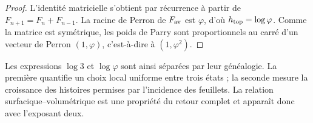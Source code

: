 \begin{proof}
L’identité matricielle s’obtient par récurrence à partir de
\(F_{n+1}=F_n+F_{n-1}\). La racine de Perron de \(F_{\rm av}\) est \(\varphi\),
d’où \(h_{\rm top}=\log\varphi\). Comme la matrice est symétrique, les poids
de Parry \cite{Parry1964} sont proportionnels au carré d’un vecteur de Perron
\((1,\varphi)\), c’est-à-dire à \((1,\varphi^2)\).
\end{proof}

Les expressions \(\log3\) et \(\log\varphi\) sont ainsi séparées par leur
généalogie. La première quantifie un choix local uniforme entre trois
états ; la seconde mesure la croissance des histoires permises par
l’incidence des feuillets. La relation surfacique--volumétrique est une propriété du
retour complet et apparaît donc avec l’exposant deux.

